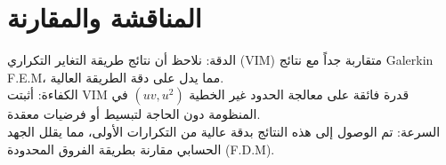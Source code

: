 \chapter*{المناقشة والمقارنة}
الدقة: نلاحظ أن نتائج طريقة التغاير التكراري (VIM) متقاربة جداً مع نتائج Galerkin F.E.M، مما يدل على دقة الطريقة العالية.\\
الكفاءة: أثبتت VIM قدرة فائقة على معالجة الحدود غير الخطية $(uv, u^2)$ في المنظومة دون الحاجة لتبسيط أو فرضيات معقدة.\\
السرعة: تم الوصول إلى هذه النتائج بدقة عالية من التكرارات الأولى، مما يقلل الجهد الحسابي مقارنة بطريقة الفروق المحدودة (F.D.M).